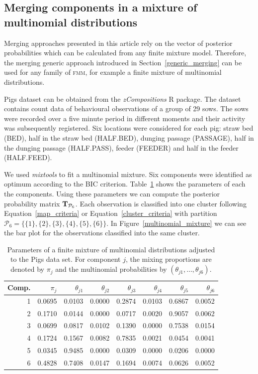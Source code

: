 \documentclass[submit]{smj}
\theoremstyle{definition}
\newcommand{\fmm}{\textsc{fmm}\xspace}
\begin{document}
\subsection{Merging components in a mixture of multinomial distributions}\label{multinom_example}

Merging approaches presented in this article rely on the vector of posterior probabilities which can be calculated from any finite mixture model. Therefore, the merging generic approach introduced in Section~\ref{generic_merging} can be used for any family of \fmm, for example a finite mixture of multinomial distributions.

Pigs dataset can be obtained from the \emph{zCompositions}  \citep{palarea2015zcompositions} R package. The dataset contains count data of behavioural observations of a group of 29 sows. The sows were recorded over a five minute period in different moments and their activity was subsequently registered. Six locations were considered for each pig: straw bed (BED), half in the straw bed (HALF.BED), dunging passage (PASSAGE), half in the dunging passage (HALF.PASS), feeder (FEEDER) and half in the feeder (HALF.FEED).

We used \emph{mixtools} \citep{benaglia2009mixtools} to fit a multinomial mixture. Six components were identified as optimum according to the BIC criterion. Table~\ref{multinomial_pars} shows the parameters of each the components. Using these parameters we can compute the posterior probability matrix $\text{\textbf{T}}_{\mathcal{P}_6}$. Each observation is classified into one cluster following Equation~\ref{map_criteria} or Equation~\ref{cluster_criteria} with partition $\mathcal{P}_6 = \{\{1\}, \{2\}, \{3\}, \{4\}, \{5\}, \{6\}\}$. In Figure~\ref{multinomial_mixture} we can see the bar plot for the observations classified into the same cluster.

\begin{table}[hp]
\caption{Parameters of a finite mixture of multinomial distributions adjusted to the Pigs data set. For component $j$, the mixing proportions are denoted by $\pi_j$ and the multinomial probabilities by $\left(\theta_{j1}, \dots, \theta_{j6}\right)$.}
\centering
\begin{tabular}{rrrrrrrr}
  \hline
 Comp.& $\pi_j$ & $\theta_{j1}$ & $\theta_{j2}$ & $\theta_{j3}$ & $\theta_{j4}$ & $\theta_{j5}$ & $\theta_{j6}$ \\ 
  \hline
  1 & 0.0695 & 0.0103 & 0.0000 & 0.2874 & 0.0103 & 0.6867 & 0.0052 \\ 
  2 & 0.1710 & 0.0144 & 0.0000 & 0.0717 & 0.0020 & 0.9057 & 0.0062 \\ 
  3 & 0.0699 & 0.0817 & 0.0102 & 0.1390 & 0.0000 & 0.7538 & 0.0154 \\ 
  4 & 0.1724 & 0.1567 & 0.0082 & 0.7835 & 0.0021 & 0.0454 & 0.0041 \\ 
  5 & 0.0345 & 0.9485 & 0.0000 & 0.0309 & 0.0000 & 0.0206 & 0.0000 \\ 
  6 & 0.4828 & 0.7408 & 0.0147 & 0.1694 & 0.0074 & 0.0626 & 0.0052 \\  
   \hline
\end{tabular}
\label{multinomial_pars}
\end{table}
\end{document}
